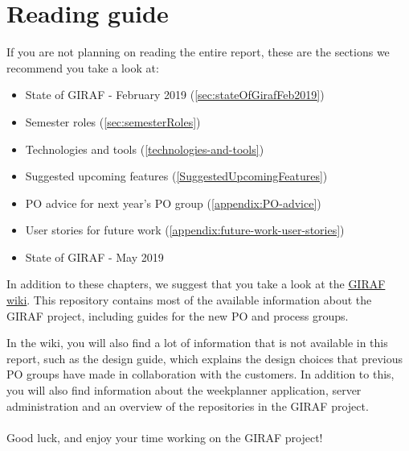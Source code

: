 \chapter*{Reading guide}
If you are not planning on reading the entire report, these are the sections we recommend you take a look at:

\begin{itemize}
    \item State of GIRAF - February 2019 (\autoref{sec:stateOfGirafFeb2019})
    \item Semester roles (\autoref{sec:semesterRoles})
    \item Technologies and tools (\autoref{technologies-and-tools})
    \item Suggested upcoming features (\autoref{SuggestedUpcomingFeatures})
    \item PO advice for next year's PO group (\autoref{appendix:PO-advice})
    \item User stories for future work (\autoref{appendix:future-work-user-stories})
    \item State of GIRAF - May 2019
\end{itemize}

In addition to these chapters, we suggest that you take a look at the \href{https://github.com/aau-giraf/wiki}{GIRAF wiki}.
This repository contains most of the available information about the GIRAF project, including guides for the new PO and process groups.

In the wiki, you will also find a lot of information that is not available in this report, such as the design guide, which explains the design choices that previous PO groups have made in collaboration with the customers.
In addition to this, you will also find information about the weekplanner application, server administration and an overview of the repositories in the GIRAF project.
\\\\
Good luck, and enjoy your time working on the GIRAF project!
